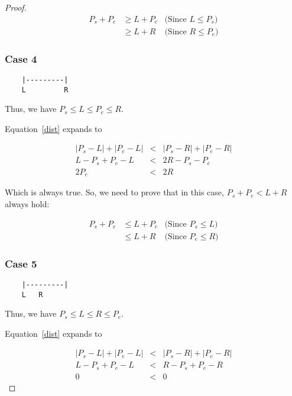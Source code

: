 \documentclass[a4paper]{article}
\begin{document}
\begin{proof}
    \begin{eqnarray*}
        P_s + P_e &\ge L + P_e & \text{(Since $L \le P_s$)} \\
        &\ge L + R & \text{(Since $R \le P_e$)}
    \end{eqnarray*}

    \subsubsection*{Case 4}

    \begin{verbatim}
    |---------|
    L         R
    \end{verbatim}

    Thus, we have $P_s \le L \le P_e \le R$.

    Equation~\ref{dist} expands to

    \begin{eqnarray*}
        |P_s - L| + |P_e - L| &<& |P_s - R| + |P_e - R| \\
        L - P_s + P_e - L &<& 2R - P_s - P_e \\
        2P_e &<& 2R
    \end{eqnarray*}

    Which is always true. So, we need to prove that in this case,
    $P_s + P_e < L+R$ always hold:

    \begin{eqnarray*}
        P_s + P_e &\le L + P_e & \text{(Since $P_s \le L$)} \\
        &\le L + R & \text{(Since $P_e \le R$)}
    \end{eqnarray*}

    \subsubsection*{Case 5}

    \begin{verbatim}
    |---------|
    L   R
    \end{verbatim}

    Thus, we have $P_s \le L \le R \le P_e$.

    Equation~\ref{dist} expands to

    \begin{eqnarray*}
        |P_s - L| + |P_e - L| &<& |P_s - R| + |P_e - R| \\
        L - P_s + P_e - L &<& R - P_s + P_e - R \\
        0 &<& 0
    \end{eqnarray*}


\end{proof}
\end{document}
